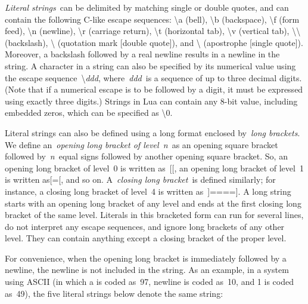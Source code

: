 \documentclass[a4paper]{article}
\begin{document}
{
\textit{Literal strings}~can be delimited by matching single or double
quotes, and can contain the following C-like escape sequences:
{\textquotesingle}{\textbackslash}a{\textquotesingle} (bell),
{\textquotesingle}{\textbackslash}b{\textquotesingle} (backspace),
{\textquotesingle}{\textbackslash}f{\textquotesingle} (form feed),
{\textquotesingle}{\textbackslash}n{\textquotesingle} (newline),
{\textquotesingle}{\textbackslash}r{\textquotesingle} (carriage
return), {\textquotesingle}{\textbackslash}t{\textquotesingle}
(horizontal tab), {\textquotesingle}{\textbackslash}v{\textquotesingle}
(vertical tab),
{\textquotesingle}{\textbackslash}{\textbackslash}{\textquotesingle}
(backslash),
{\textquotesingle}{\textbackslash}{\textquotedbl}{\textquotesingle}
(quotation mark [double quote]), and
{\textquotesingle}{\textbackslash}{\textquotesingle}{\textquotesingle}
(apostrophe [single quote]). Moreover, a backslash followed by a real
newline results in a newline in the string. A character in a string can
also be specified by its numerical value using the escape
sequence~{\textbackslash}\textit{ddd}, where~\textit{ddd}~is a sequence
of up to three decimal digits. (Note that if a numerical escape is to
be followed by a digit, it must be expressed using exactly three
digits.) Strings in Lua can contain any 8-bit value, including embedded
zeros, which can be specified as
{\textquotesingle}{\textbackslash}0{\textquotesingle}.}

{
Literal strings can also be defined using a long format enclosed
by~\textit{long brackets}. We define an~\textit{opening long bracket of
level~n}~as an opening square bracket followed by~\textit{n}~equal
signs followed by another opening square bracket. So, an opening long
bracket of level~0 is written as~[[, an opening long bracket of level~1
is written as[=[, and so on. A~\textit{closing long bracket}~is defined
similarly; for instance, a closing long bracket of level~4 is written
as~]====]. A long string starts with an opening long bracket of any
level and ends at the first closing long bracket of the same level.
Literals in this bracketed form can run for several lines, do not
interpret any escape sequences, and ignore long brackets of any other
level. They can contain anything except a closing bracket of the proper
level.}

{
For convenience, when the opening long bracket is immediately followed
by a newline, the newline is not included in the string. As an example,
in a system using ASCII (in which {\textquotesingle}a{\textquotesingle}
is coded as~97, newline is coded as~10, and
{\textquotesingle}1{\textquotesingle} is coded as~49), the five literal
strings below denote the same string:}
\end{document}

